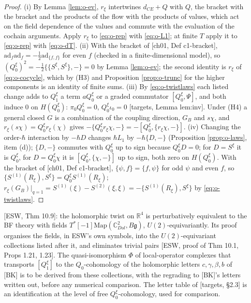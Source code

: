 \begin{proof}
(i) By Lemma \ref{lem:o-ev}, $r_\xi$ intertwines $d_{CE}+Q$ with $Q$, the bracket with the bracket and the products of the flow with the products of values, which act on the field dependence of the values and commute with the evaluation of the cochain arguments. Apply $r_\xi$ to \eqref{eq:o-rep} with \eqref{eq:o-L1}; at finite $T$ apply it to \eqref{eq:o-rep} with \eqref{eq:o-dT}. (ii) With the bracket of [ch01, Def c1-bracket], $\mathrm{ad}_f\mathrm{ad}_f=-\tfrac12\mathrm{ad}_{\{f,f\}}$ for even $f$ (checked in a finite-dimensional model), so $(Q^\xi_0)^2=-\tfrac12\{\{S^\xi,S^\xi\},-\}=0$ by Lemma \ref{lem:o-ev}; the second identity is $r_\xi$ of \eqref{eq:o-cocycle}, which by (H3) and Proposition \ref{prop:o-trunc} for the higher components is an identity of finite sums. (iii) By \eqref{eq:o-twistlaws} each listed change adds to $Q^\xi_1$ a term $aQ^\xi_0$ or a graded commutator $[Q^\xi_0,\Psi]$, and both induce $0$ on $H(Q^\xi_0)$: $\pi_0Q^\xi_0=0$, $Q^\xi_0\iota_0=0$ [targets, Lemma lem:inv]. Under (H4) a general closed $G$ is a combination of the coupling direction, $G_B$ and $s\chi$, and $r_\xi(s\chi)=Q^\xi_0r_\xi(\chi)$ gives $-\{Q^\xi_0r_\xi\chi,-\}=-[Q^\xi_0,\{r_\xi\chi,-\}]$. (iv) Changing the order-$\hbar$ interaction by $-\hbar D$ changes $\hbar L_1$ by $-\hbar\{D,-\}$ (Proposition \ref{prop:o-laws}, item (d)); $\{D,-\}$ commutes with $Q^\xi_0$ up to sign because $Q^\xi_0D=0$; for $D=S^\xi$ it is $Q^\xi_0$, for $D=Q^\xi_0\chi$ it is $[Q^\xi_0,\{\chi,-\}]$ up to sign, both zero on $H(Q^\xi_0)$. With the bracket of [ch01, Def c1-bracket], $\{\psi,f\}=\{f,\psi\}$ for odd $\psi$ and even $f$, so $\{S^{(1)}(R_\xi),S^\xi\}=Q^\xi_0S^{(1)}(R_\xi)$; $r_\xi(G_B)|_{q=1}=S^{(1)}(\xi)-S^{(2)}(\xi,\xi)=-\{S^{(1)}(R_\xi),S^\xi\}$ by \eqref{eq:o-twistlaws}.
\end{proof}

\begin{remark}
\label{rem:o-transport}
[ESW, Thm 10.9]: the holomorphic twist on $\mathbb R^4$ is perturbatively equivalent to the BF theory with fields $T^*[-1]\mathrm{Map}(\mathbb C^2_{Dol},B\mathfrak g)$, $U(2)$-equivariantly. Its proof organises the fields, in ESW's own symbols, into the $U(2)$-equivariant collections listed after it, and eliminates trivial pairs [ESW, proof of Thm 10.1, Props 1.21, 1.23]. The quasi-isomorphism $\Phi$ of local-operator complexes that transports $[Q^\xi_1]$ to the $Q_0$-cohomology of the holomorphic letters $c,\gamma,\beta,b$ of [BK] is to be derived from these collections, with the regrading to [BK]'s letters written out, before any numerical comparison. The letter table of [targets, §2.3] is an identification at the level of free $Q^\xi_0$-cohomology, used for comparison.
\end{remark}

